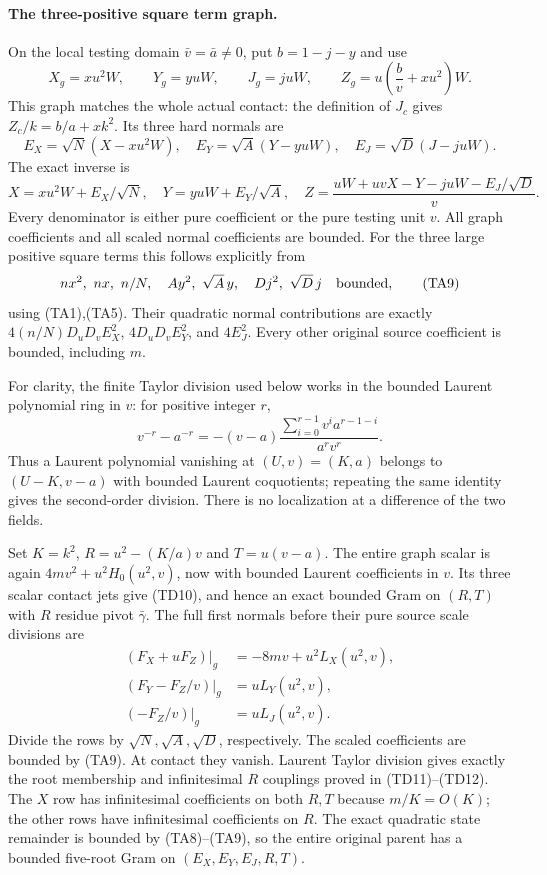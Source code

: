 \paragraph{The three-positive square term graph.}
On the local testing domain $\bar v=\bar a\ne0$, put
$b=1-j-y$ and use
\[
 X_g=xu^2W,\qquad Y_g=yuW,\qquad J_g=juW,\qquad
 Z_g=u\left(\frac b v+xu^2\right)W.                            \tag{TA6}
\]
This graph matches the whole actual contact: the definition of $J_c$
gives $Z_c/k=b/a+xk^2$. Its three hard normals are
\[
 E_X=\sqrt N(X-xu^2W),\quad
 E_Y=\sqrt A(Y-yuW),\quad E_J=\sqrt D(J-juW).                    \tag{TA7}
\]
The exact inverse is
\[
 X=xu^2W+E_X/\sqrt N,\quad Y=yuW+E_Y/\sqrt A,
\quad Z=\frac{uW+uvX-Y-juW-E_J/\sqrt D}{v}.                    \tag{TA8}
\]
Every denominator is either pure coefficient or the pure testing
unit $v$. All graph coefficients and all scaled normal coefficients
are bounded. For the three large positive square terms this follows explicitly
from
\[
 n x^2,\ nx,\ n/N,\quad A y^2,\ \sqrt A\,y,\quad
 D j^2,\ \sqrt D\,j\quad\hbox{bounded},                       \tag{TA9}
\]
using (TA1),(TA5). Their quadratic normal contributions are exactly
$4(n/N)D_uD_v E_X^2$, $4D_uD_vE_Y^2$, and $4E_J^2$.
Every other original source coefficient is bounded, including $m$.

For clarity, the finite Taylor division used below works in the
bounded Laurent polynomial ring in $v$: for positive integer $r$,
\[
 v^{-r}-a^{-r}
 =-(v-a)\frac{\sum_{i=0}^{r-1}v^i a^{r-1-i}}{a^rv^r}.
\]
Thus a Laurent polynomial vanishing at $(U,v)=(K,a)$ belongs to
$(U-K,v-a)$ with bounded Laurent coquotients; repeating the same
identity gives the second-order division. There is no localization
at a difference of the two fields.

Set $K=k^2$, $R=u^2-(K/a)v$ and $T=u(v-a)$. The entire graph
scalar is again $4mv^2+u^2H_0(u^2,v)$, now with bounded Laurent
coefficients in $v$. Its three scalar contact jets give (TD10),
and hence an exact bounded Gram on $(R,T)$ with $R$ residue pivot
$\bar\gamma$. The full first normals before their pure source
scale divisions are
\[
\begin{split}
 (F_X+uF_Z)|_g&=-8mv+u^2L_X(u^2,v),\\
 (F_Y-F_Z/v)|_g&=uL_Y(u^2,v),\\
 (-F_Z/v)|_g&=uL_J(u^2,v).                                     \end{split} \tag{TA10}
\]
Divide the rows by $\sqrt N,\sqrt A,\sqrt D$, respectively.
The scaled coefficients are bounded by (TA9). At contact they
vanish. Laurent Taylor division gives exactly the root membership
and infinitesimal $R$ couplings proved in (TD11)--(TD12).
The $X$ row has infinitesimal coefficients on both $R,T$ because
$m/K=O(K)$; the other rows have infinitesimal coefficients on $R$.
The exact quadratic state remainder is bounded by (TA8)--(TA9),
so the entire original parent has a bounded five-root Gram on
$(E_X,E_Y,E_J,R,T)$.

